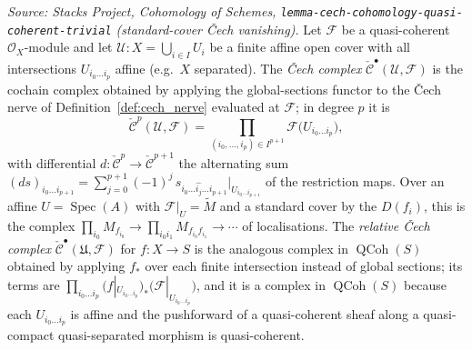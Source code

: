 \begin{definition}\leanok
  \label{def:cech_complex}
  \textit{Source: Stacks Project, Cohomology of Schemes,
  \texttt{lemma-cech-cohomology-quasi-coherent-trivial} (standard-cover {\v C}ech
  vanishing).}
  Let \(\mathcal{F}\) be a quasi-coherent \(\mathcal{O}_X\)-module and let
  \(\mathcal{U} : X = \bigcup_{i \in I} U_i\) be a finite affine open cover with
  all intersections \(U_{i_0 \ldots i_p}\) affine (e.g.\ \(X\) separated). The
  \emph{{\v C}ech complex} \(\check{\mathcal{C}}^\bullet(\mathcal{U}, \mathcal{F})\)
  is the cochain complex obtained by applying the global-sections functor to the
  {\v C}ech nerve of Definition~\ref{def:cech_nerve} evaluated at \(\mathcal{F}\);
  in degree \(p\) it is
  \[
    \check{\mathcal{C}}^p(\mathcal{U}, \mathcal{F})
      = \prod_{(i_0, \ldots, i_p) \in I^{p+1}}
        \mathcal{F}\bigl(U_{i_0 \ldots i_p}\bigr),
  \]
  with differential \(d : \check{\mathcal{C}}^p \to \check{\mathcal{C}}^{p+1}\) the
  alternating sum \((d s)_{i_0 \ldots i_{p+1}} = \sum_{j=0}^{p+1} (-1)^j\,
  s_{i_0 \ldots \widehat{i_j} \ldots i_{p+1}}|_{U_{i_0 \ldots i_{p+1}}}\) of the
  restriction maps. Over an affine \(U = \operatorname{Spec}(A)\) with
  \(\mathcal{F}|_U = \widetilde{M}\) and a standard cover by the
  \(D(f_i)\), this is the complex
  \(\prod_{i_0} M_{f_{i_0}} \to \prod_{i_0 i_1} M_{f_{i_0} f_{i_1}} \to \cdots\) of
  localisations. The \emph{relative {\v C}ech complex} \(\check{\mathcal{C}}^\bullet
  (\mathfrak{U}, \mathcal{F})\) for \(f : X \to S\) is the analogous complex in
  \(\operatorname{QCoh}(S)\) obtained by applying \(f_*\) over each finite
  intersection instead of global sections; its terms are
  \(\prod_{i_0 \ldots i_p} (f|_{U_{i_0 \ldots i_p}})_*
  \bigl(\mathcal{F}|_{U_{i_0 \ldots i_p}}\bigr)\), and it is a complex in
  \(\operatorname{QCoh}(S)\) because each \(U_{i_0 \ldots i_p}\) is affine and the
  pushforward of a quasi-coherent sheaf along a quasi-compact quasi-separated
  morphism is quasi-coherent.
\end{definition}

